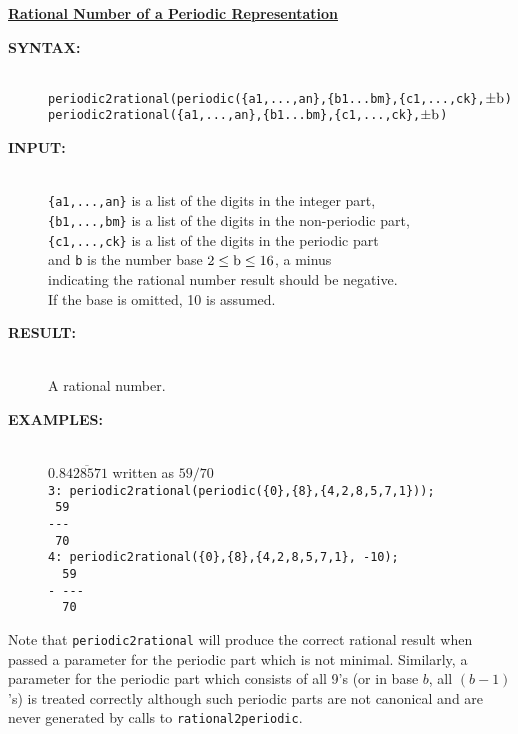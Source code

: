 \textbf{\underline{Rational Number of a Periodic Representation}}\\[\baselineskip]
\begin{description}
\item[\textbf{SYNTAX:}]\mbox{}\\
  \texttt{periodic2rational(periodic(\{a1,...,an\},\{b1...bm\},\{c1,...,ck\},$\pm{\rm b}$)}\\
  \texttt{periodic2rational(\{a1,...,an\},\{b1...bm\},\{c1,...,ck\},$\pm{\rm b}$)}

\item[\textbf{INPUT:}]\mbox{}\\
  \texttt{\{a1,...,an\}} is a list of the digits in the integer part,\\
  \texttt{\{b1,...,bm\}} is a list of the digits in the non-periodic part,\\
  \texttt{\{c1,...,ck\}} is a list of the digits in the periodic part\\
  and {\tt b} is the number base $2 \leq {\rm b} \leq 16$, a minus\\
  indicating the rational number result should be negative. \\
  If the base is omitted, 10 is assumed.

\item[\textbf{RESULT:}]\mbox{}\\
  A rational number.

\item[\textbf{EXAMPLES:}]\mbox{}\\[\baselineskip]
  $0.8\overline{428571}$ written as $59/70$ \\
  \texttt{3: periodic2rational(periodic(\{0\},\{8\},\{4,2,8,5,7,1\}));}
  \\[\baselineskip]
  \verb| 59|\\
  \verb|---|\\
  \verb| 70|\\[\baselineskip]
  \texttt{4: periodic2rational(\{0\},\{8\},\{4,2,8,5,7,1\}, -10);}
  \\[\baselineskip]
  \verb|  59|\\
  \verb|- ---|\\
  \verb|  70|
\end{description}

Note that \texttt{periodic2rational} will produce the correct rational result
when passed a parameter for the periodic part which is not minimal.
Similarly, a parameter for the periodic part which consists of all 9's
(or in base $b$, all $(b-1)$'s) is treated correctly although such periodic
parts are not canonical and are never generated by calls to
\texttt{rational2periodic}.

